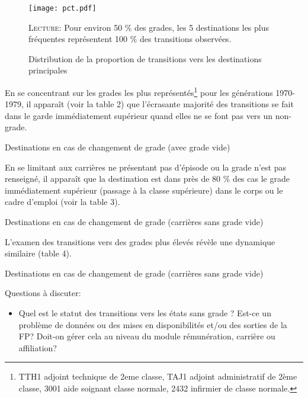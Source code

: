 \documentclass[11pt,a4paper]{article}
\begin{document}
\begin{figure}[h!]
  \label{pct}
\caption{Distribution de la proportion de transitions vers les destinations principales}
\vspace{-0.1cm}
\centering
 \texttt{[image: pct.pdf]}
\vspace{0.1cm}  
\begin{minipage}{12cm}%
\small \textsc{Lecture:} Pour environ 50 \% des grades, les 5 destinations les plus fréquentes représentent 100 \% des transitions observées.  
 \end{minipage}%
\end{figure}

En se concentrant sur les grades les plus représentés\footnote{TTH1 adjoint technique de 2eme classe, TAJ1 adjoint administratif de 2ème classe, 3001 aide soignant classe normale, 2432 infirmier de classe normale.}
pour les générations 1970-1979, il apparaît (voir la table 2) que l'écrasante majorité des transitions se fait dans le garde immédiatement supérieur quand elles ne se font pas vers un non-grade.
\begin{table}[h!]
    \label{tab:destination}
    \centering
    \caption{Destinations en cas de changement de grade (avec grade vide)} 
    
\end{table}

En se limitant aux carrières ne présentant pas d'épisode ou la grade n'est pas renseigné, il apparaît que la destination est dans près de 80 \% des cas le grade immédiatement supérieur (passage à la classe supérieure) dans le corps ou le cadre d'emploi (voir la table 3).       

\begin{table}[h!]
    \label{tab:purged_destination}
    \centering
    \caption{Destinations en cas de changement de grade (carrières sans grade vide)} 
    
\end{table}

L'examen des transitions vers des grades plus élevés révèle une dynamique similaire (table 4).
\begin{table}[htbp]
    \label{tab:purged_second_destination}
    \centering
    \caption{Destinations en cas de changement de grade (carrières sans grade vide)} 
    
\end{table}

Questions à discuter:
\begin{itemize}[leftmargin=1cm, parsep=0cm, itemsep=0cm, topsep=0cm] 
    \item Quel est le statut des transitions vers les états sans grade ? Est-ce un problème de données ou des mises en disponibilités et/ou des sorties de la FP? Doit-on gérer cela au niveau du module rémunération, carrière ou affiliation? 
\end{itemize}




\ifx\isEmbedded\undefined
\newpage
 

\end{document}
